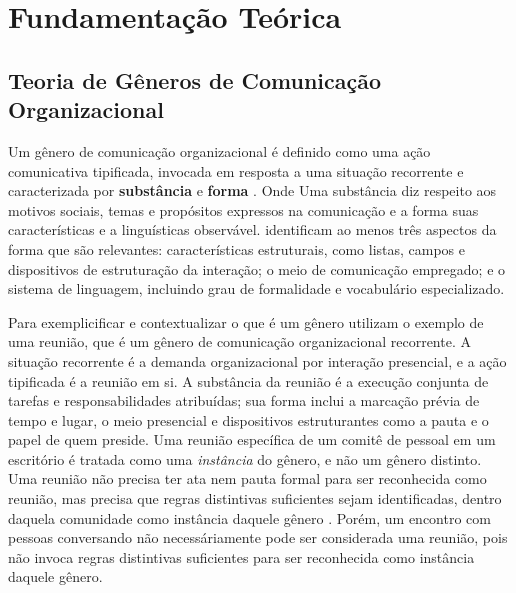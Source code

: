 

\chapter{Fundamentação Teórica}\label{chap:fundamentacao}

\section{Teoria de Gêneros de Comunicação Organizacional}
\label{sec:teoria-generos}


Um gênero de comunicação organizacional é definido como uma ação comunicativa tipificada, invocada em resposta a uma situação recorrente e caracterizada por \textbf{substância} e \textbf{forma} \cite{GenresOrgComm}. Onde Uma substância diz respeito aos motivos sociais, temas e propósitos expressos na comunicação e a forma suas características e a linguísticas observável. 
\cite{GenresOrgComm} identificam ao menos três aspectos da forma que são relevantes: características estruturais, como listas, campos e dispositivos de estruturação da interação; o meio de comunicação empregado; e o sistema de linguagem, incluindo grau de formalidade e vocabulário especializado.

Para exemplicificar e contextualizar o que é um gênero \cite{GenresOrgComm} utilizam o exemplo de uma reunião, que é um gênero de comunicação organizacional recorrente. A situação recorrente é a demanda organizacional por interação presencial, e a ação tipificada é a reunião em si. A substância da reunião é a execução conjunta de tarefas e responsabilidades atribuídas; sua forma inclui a marcação prévia de tempo e lugar, o meio presencial e dispositivos estruturantes como a pauta e o papel de quem preside. Uma reunião específica de um comitê de pessoal em um escritório é tratada como uma \emph{instância} do gênero, e não um gênero distinto. Uma reunião não precisa ter ata nem pauta formal para ser reconhecida como reunião, mas precisa que regras distintivas suficientes sejam identificadas, dentro daquela comunidade como instância daquele gênero \cite{GenresOrgComm}. Porém, um encontro com pessoas conversando não necessáriamente pode ser considerada uma reunião, pois não invoca regras distintivas suficientes para ser reconhecida como instância daquele gênero.

